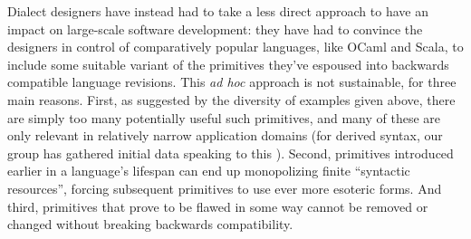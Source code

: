 Dialect designers have instead had to take a less direct approach to have an impact on large-scale software development: they have had to convince the designers in control of comparatively popular languages, like OCaml and Scala, to include some suitable variant of the primitives they've espoused into backwards compatible language revisions. %
This \emph{ad hoc} approach is not sustainable, for three main reasons. First, as suggested by the diversity of examples given above, there are simply too  many potentially useful such primitives, and many of these are only relevant in relatively narrow application domains (for derived syntax, our group has  gathered initial data speaking to this \cite{TSLs}). Second, primitives introduced earlier in a language's lifespan can end up monopolizing finite ``syntactic resources'', forcing subsequent primitives to use ever more esoteric forms. And third, primitives that prove to be flawed in some way cannot be removed or changed without breaking backwards compatibility. %

